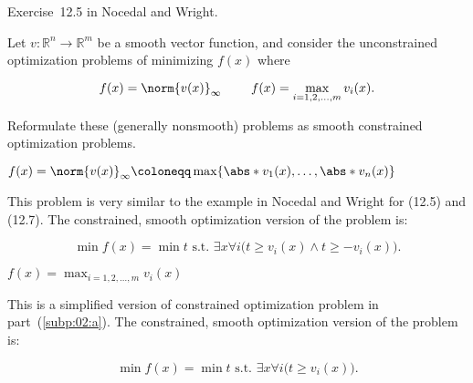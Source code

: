\begin{problem}\label{prob:02}%
  Exercise~12.5 in Nocedal and Wright.
  
  Let $v:\mathbb{R}^n \rightarrow \mathbb{R}^m$ be a smooth vector function, and consider the unconstrained optimization problems of minimizing $f(x)$ where
  
  \[f(x)=\norm{v(x)}_{\infty}~~~~~~~f(x)=\max_{i=1,2,\ldots,m}v_i(x)\text{.}\]
  
  \noindent
  Reformulate these (generally nonsmooth) problems as smooth constrained optimization problems.
\end{problem}

\begin{subproblem}\label{subp:02:a}%
  $f(x)=\norm{v(x)}_{\infty} \coloneqq \max\{\abs*{v_1(x)},\ldots,\abs*{v_n(x)}\}$
\end{subproblem}

This problem is very similar to the example in Nocedal and Wright for (12.5) and (12.7).  The constrained, smooth optimization version of the problem is:

\[\min f(x) = \min t \text{ s.t.\ } \exists x \forall i \big( t \ge v_i(x)  \wedge t \ge -v_i(x)\big)  \text{.}\]

\begin{subproblem}
  $f(x)=\max_{i=1,2,\ldots,m}v_i(x)$
\end{subproblem}

This is a simplified version of constrained optimization problem in part~(\ref{subp:02:a}).  The constrained, smooth optimization version of the problem is:

\[\min f(x) = \min t \text{ s.t.\ } \exists x \forall i \big( t \ge v_i(x) \big) \text{.}\]
